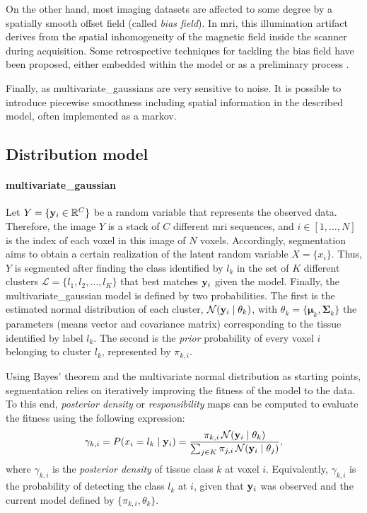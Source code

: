On the other hand, most imaging datasets are affected to some degree
  by a spatially smooth offset field (called \emph{bias field}).
In \gls*{mri}, this illumination artifact derives from the spatial
  inhomogeneity of the magnetic field inside the scanner during
  acquisition.
Some retrospective techniques for tackling the bias field have
  been proposed, either embedded within the model
  \citep{van_leemput_automated_1999} or as a
  preliminary process \citep{tustison_n4itk:_2010}.

Finally, as \glspl*{multivariate_gaussian} are very sensitive to
  noise.
It is possible to introduce piecewise smoothness including
  spatial information in the described model, often
  implemented as a \gls*{markov}.
  
\subsection{Distribution model}
\label{sec:model}

\paragraph{\Acrlong*{multivariate_gaussian}}
Let $Y = \{\mathbf{y}_i \in \mathbb{R}^C \}$ be a random variable that
  represents the observed data. Therefore, the image $Y$ is a stack
  of $C$ different \gls*{mri} sequences, and $i \in [1,\ldots,N]$
  is the index of each voxel in this image of $N$ voxels.
Accordingly, segmentation aims to obtain a certain realization of
  the latent random variable $X = \{ x_i \}$.
Thus, $Y$ is segmented after finding the class identified by 
  $l_k$ in the set of $K$ different clusters 
  $\mathcal{L} = \{l_1, l_2, \ldots, l_K \}$ that best matches
  $\mathbf{y}_i$ given the model.
Finally, the \gls*{multivariate_gaussian} model is defined by two
  probabilities.
The first is the estimated normal distribution of each
  cluster, $\mathcal{N}(\mathbf{y}_i \mid \theta_k )$, with
  $\theta_k = \{\boldsymbol{\mu}_k,\boldsymbol{\Sigma}_k\}$
  the parameters (means vector and covariance matrix)
  corresponding to the tissue identified by label $l_k$.
The second is the \emph{prior} probability of every voxel $i$
  belonging to cluster $l_k$, represented by $\pi_{k,i}$.

Using Bayes' theorem and the multivariate normal distribution as
  starting points, segmentation relies on iteratively improving the
  fitness of the model to the data.
To this end, \emph{posterior density} or \emph{responsibility} maps
  can be computed to evaluate the fitness \citep{bishop_pattern_2009}
  using the following expression:
\begin{equation}
\label{eq:post_density}
\gamma_{k,i}=P(x_i = l_k \mid \mathbf{y}_i) = \frac
{\pi_{k,i} \, \mathcal{N}(\mathbf{y}_i \mid \theta_k )}
{\sum_{j\in K} \pi_{j,i} \, \mathcal{N}(\mathbf{y}_i \mid \theta_j ) },
\end{equation}
where $\gamma_{k,i}$ is the \emph{posterior density} of tissue class 
  $k$ at voxel $i$. Equivalently, $\gamma_{k,i}$ is the probability of
  detecting the class $l_k$ at $i$, given that $\mathbf{y}_i$ was observed
  and the current model defined by $\lbrace \pi_{k,i}, \theta_k \rbrace$.
  
